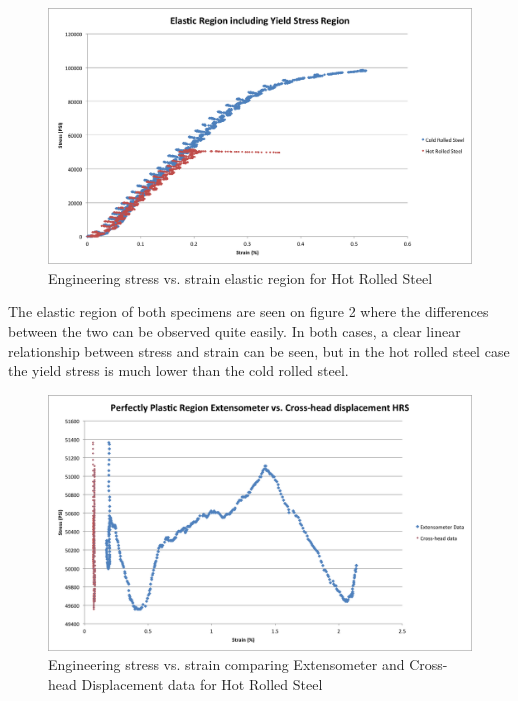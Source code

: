 \documentclass[12pt]{report}
\begin{document}
\begin{figure}[H]
	\includegraphics[width=1\textwidth]{elastic_region.png}
	\caption{Engineering stress vs. strain elastic region for Hot Rolled Steel}
	\label{fig:Figure2}
\end{figure}

The elastic region of both specimens are seen on figure 2 where the differences between the two can be observed quite easily. In both cases, a clear linear relationship between stress and strain can be seen, but in the hot rolled steel case the yield stress is much lower than the cold rolled steel. 

\begin{figure}[H]
	\includegraphics[width=1\textwidth]{extensometer_vs_crosshead_HRS.png}
	\caption{Engineering stress vs. strain comparing Extensometer and Cross-head Displacement data for Hot Rolled Steel}
	\label{fig:Figure3}
\end{figure}
\end{document}
